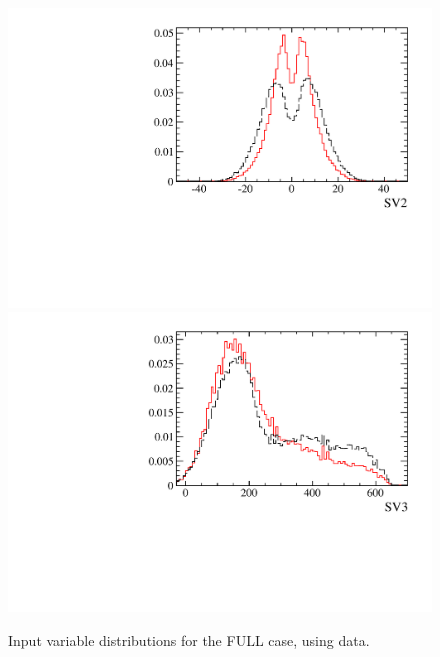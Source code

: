 \begin{figure} [htb!]
\begin{center}
\includegraphics[scale=0.20]{figs/SV2FULL2pipi.pdf}
\includegraphics[scale=0.20]{figs/SV3FULL2pipi.pdf}
\caption{Input variable distributions for the FULL case, using \Kspipi data. \label{fig:MVAhistos_FULL2pipi2}}
\end{center}
\end{figure}

